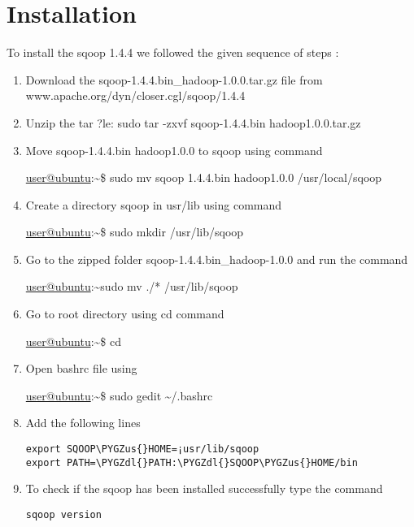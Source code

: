 \documentclass[letterpaper,10pt,english]{sphinxmanual}
\def\PYGZus{\char`\_}
\def\PYGZdl{\char`\$}
\begin{document}
\section{Installation}
\label{sqoop:installation}
To install the sqoop 1.4.4 we followed the given sequence of steps :
\begin{enumerate}
\item {} 
Download the sqoop-1.4.4.bin\_hadoop-1.0.0.tar.gz  file from
www.apache.org/dyn/closer.cgl/sqoop/1.4.4

\item {} 
Unzip the tar ?le: sudo tar -zxvf sqoop-1.4.4.bin hadoop1.0.0.tar.gz

\item {} 
Move sqoop-1.4.4.bin hadoop1.0.0 to sqoop using command

\href{mailto:user@ubuntu}{user@ubuntu}:\textasciitilde{}\$  sudo mv sqoop  1.4.4.bin hadoop1.0.0 /usr/local/sqoop

\item {} 
Create a directory sqoop in usr/lib using command

\href{mailto:user@ubuntu}{user@ubuntu}:\textasciitilde{}\$ sudo mkdir /usr/lib/sqoop

\item {} 
Go to the zipped folder sqoop-1.4.4.bin\_hadoop-1.0.0 and run the command

\href{mailto:user@ubuntu}{user@ubuntu}:\textasciitilde{}sudo mv ./* /usr/lib/sqoop

\item {} 
Go to root directory using cd command

\href{mailto:user@ubuntu}{user@ubuntu}:\textasciitilde{}\$  cd

\item {} 
Open bashrc file using

\href{mailto:user@ubuntu}{user@ubuntu}:\textasciitilde{}\$  sudo gedit \textasciitilde{}/.bashrc

\item {} 
Add the following lines

\begin{Verbatim}[commandchars=\\\{\}]
export SQOOP\PYGZus{}HOME=¡usr/lib/sqoop
export PATH=\PYGZdl{}PATH:\PYGZdl{}SQOOP\PYGZus{}HOME/bin
\end{Verbatim}

\item {} 
To check if the sqoop has been installed  successfully type the command

\begin{Verbatim}[commandchars=\\\{\}]
sqoop version
\end{Verbatim}

\end{enumerate}
\end{document}
